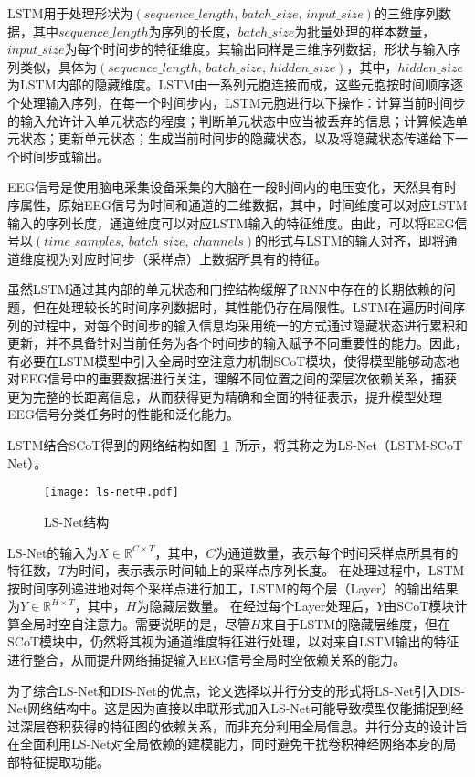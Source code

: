 LSTM用于处理形状为\((sequence\_length,\, batch\_size,\, input\_size)\)的三维序列数据，其中\(sequence\_length\)为序列的长度，\(batch\_size\)为批量处理的样本数量，\(input\_size\)为每个时间步的特征维度。其输出同样是三维序列数据，形状与输入序列类似，具体为\((sequence\_length,\,batch\_size,\, hidden\_size)\)，其中，\(hidden\_size\)为LSTM内部的隐藏维度。LSTM由一系列元胞连接而成，这些元胞按时间顺序逐个处理输入序列，在每一个时间步内，LSTM元胞进行以下操作：计算当前时间步的输入允许计入单元状态的程度；判断单元状态中应当被丢弃的信息；计算候选单元状态；更新单元状态；生成当前时间步的隐藏状态，以及将隐藏状态传递给下一个时间步或输出。

EEG信号是使用脑电采集设备采集的大脑在一段时间内的电压变化，天然具有时序属性，原始EEG信号为时间和通道的二维数据，其中，时间维度可以对应LSTM输入的序列长度，通道维度可以对应LSTM输入的特征维度。由此，可以将EEG信号以\((time\_samples,\, batch\_size,\, channels)\)的形式与LSTM的输入对齐，即将通道维度视为对应时间步（采样点）上数据所具有的特征。

虽然LSTM通过其内部的单元状态和门控结构缓解了RNN中存在的长期依赖的问题，但在处理较长的时间序列数据时，其性能仍存在局限性。LSTM在遍历时间序列的过程中，对每个时间步的输入信息均采用统一的方式通过隐藏状态进行累积和更新，并不具备针对当前任务为各个时间步的输入赋予不同重要性的能力。因此，有必要在LSTM模型中引入全局时空注意力机制SCoT模块，使得模型能够动态地对EEG信号中的重要数据进行关注，理解不同位置之间的深层次依赖关系，捕获更为完整的长距离信息，从而获得更为精确和全面的特征表示，提升模型处理EEG信号分类任务时的性能和泛化能力。

LSTM结合SCoT得到的网络结构如图~\ref{fig:ls}~所示，将其称之为LS-Net（LSTM-SCoT Net）。
\begin{figure}
    \centering
    \texttt{[image: ls-net中.pdf]}
    \caption{LS-Net结构}
    \label{fig:ls}
\end{figure}
LS-Net的输入为\(X \in \mathbb{R}^{C \times T}\)，其中，\(C\)为通道数量，表示每个时间采样点所具有的特征数，\(T\)为时间，表示表示时间轴上的采样点序列长度。
在处理过程中，LSTM按时间序列递进地对每个采样点进行加工，LSTM的每个层（Layer）的输出结果为\(Y \in \mathbb{R}^{H \times T}\)，其中，\(H\)为隐藏层数量。
在经过每个Layer处理后，\(Y\)由SCoT模块计算全局时空自注意力。需要说明的是，尽管\(H\)来自于LSTM的隐藏层维度，但在SCoT模块中，仍然将其视为通道维度特征进行处理，以对来自LSTM输出的特征进行整合，从而提升网络捕捉输入EEG信号全局时空依赖关系的能力。

为了综合LS-Net和DIS-Net的优点，论文选择以并行分支的形式将LS-Net引入DIS-Net网络结构中。这是因为直接以串联形式加入LS-Net可能导致模型仅能捕捉到经过深层卷积获得的特征图的依赖关系，而非充分利用全局信息。并行分支的设计旨在全面利用LS-Net对全局依赖的建模能力，同时避免干扰卷积神经网络本身的局部特征提取功能。

